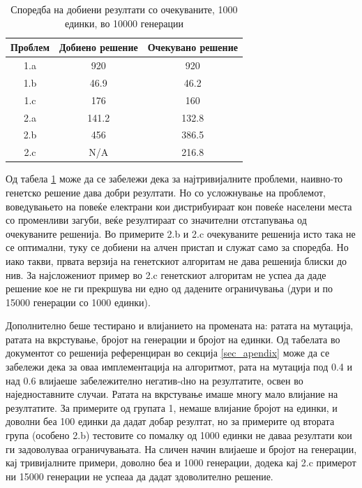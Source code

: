 \documentclass{article}
\begin{document}
\begin{table}[h!]
\centering
\begin{tabular}{||c c c||} 
 \hline
 Проблем & Добиено решение & Очекувано решение \\ [0.5ex]
 \hline\hline
 1.a & 920 & 920\\ 
 1.b & 46.9 & 46.2 \\
 1.c & 176 & 160 \\
 2.a & 141.2 & 132.8 \\
 2.b & 456 & 386.5 \\
 2.c & N/A & 216.8 \\ [1ex] 
 \hline
\end{tabular}
\caption{Споредба на добиени резултати со очекуваните, 1000 единки, во 10000 генерации}
\label{table_rez_ver1}
\end{table}

Од табела \ref{table_rez_ver1} може да се забележи дека за најтривијалните проблеми, наивно-то генетско решение дава добри резултати. Но со усложнување на проблемот, воведувањето на повеќе електрани кои дистрибуираат кон повеќе населени места со променливи загуби, веќе резултираат со значителни отстапувања од очекуваните решенија. Во примерите 2.b и 2.c очекуваните решенија исто така не се оптимални, туку се добиени на алчен пристап и служат само за споредба. Но иако такви, првата верзија на генетскиот алгоритам не дава решенија блиски до нив. За најсложениот пример во 2.c генетскиот алгоритам не успеа да даде решение кое не ги прекршува ни едно од дадените ограничувања (дури и по 15000 генерации со 1000 единки). 

Дополнително беше тестирано и влијанието на промената на: ратата на мутација, ратата на вкрстување, бројот на генерации и бројот на единки. Од табелата во документот со решенија референциран во секција \ref{sec_apendix} може да се забележи дека за оваа имплементација на алгоритмот, рата на мутација под 0.4 и над 0.6 влијаеше забележително негатив-dно на резултатите, освен во наједноставните случаи. Ратата на вкрстување имаше многу мало влијание на резултатите. За примерите од групата 1, немаше влијание бројот на единки, и доволни беа 100 единки да дадат добар резултат, но за примерите од втората група (особено 2.b) тестовите со помалку од 1000 единки не даваа резултати кои ги задоволуваа ограничувањата. На сличен начин влијаеше и бројот на генерации, кај тривијалните примери, доволно беа и 1000 генерации, додека кај  2.c примерот ни 15000 генерации не успеаа да дадат здоволително решение.
\end{document}
